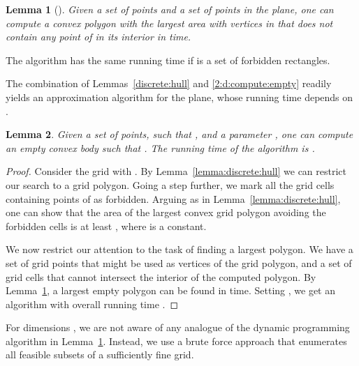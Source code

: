 \documentclass[11pt]{article}
\newtheorem{lemma}{Lemma}
\newcommand{\lemlab}[1]{\label{lemma:#1}}
\newcommand{\lemref}[1]{Lemma~\ref{lemma:#1}}
\begin{document}
\begin{lemma}[\cite{BDL+11}]\lemlab{2:d:compute:empty}\label{2:d:compute:empty}
    Given a set  of  points and a set  of 
    points in the plane, one can compute a convex polygon with the
    largest area with vertices in  that does not contain any
    point of  in its interior in  time.
\end{lemma}

The algorithm has the same running time if  is a set of
 forbidden rectangles.

\smallskip
The combination of Lemmas~\ref{discrete:hull} and \ref{2:d:compute:empty}
readily yields an approximation algorithm for the plane, whose running
time depends on .

\begin{lemma}\lemlab{brute:force} \label{brute:force}
    Given a set  of  points, such that
    , and a parameter , one can
    compute an empty convex body  such that
    .  The running time of the
    algorithm is .
\end{lemma}
\begin{proof}
    Consider the grid  with .
    By \lemref{discrete:hull} we can restrict our search to a grid polygon.
    Going a step further, we mark all the grid cells containing points of
     as forbidden. Arguing as in \lemref{discrete:hull},
    one can show that the area of the largest convex grid polygon avoiding
    the forbidden cells is at least , where  is
    a constant.

    We now restrict our attention to the task of finding a largest
    polygon. We have a set  of  grid points that
    might be used as vertices of the grid polygon, and a set of
     grid cells that cannot intersect the interior of the
    computed polygon. By \lemref{2:d:compute:empty}, a largest
    empty polygon can be found in  time. Setting
    , we get an algorithm with overall
    running time .
\end{proof}

For dimensions , we are not aware of any analogue of the
dynamic programming algorithm in \lemref{2:d:compute:empty}.
Instead, we use a brute force approach that enumerates all feasible
subsets of a sufficiently fine grid.
\end{document}
